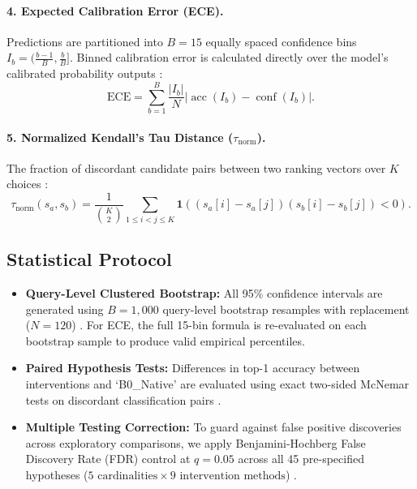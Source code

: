 \documentclass[11pt,a4paper]{article}
\begin{document}
\paragraph{4. Expected Calibration Error (ECE).}
Predictions are partitioned into $B=15$ equally spaced confidence bins $I_b = (\frac{b-1}{B}, \frac{b}{B}]$. Binned calibration error is calculated directly over the model's calibrated probability outputs \citep{guo2017calibration, naeini2015obtaining, nixon2019measuring}:
\begin{equation}
\mathrm{ECE} = \sum_{b=1}^B \frac{|I_b|}{N} \left| \operatorname{acc}(I_b) - \operatorname{conf}(I_b) \right|.
\end{equation}

\paragraph{5. Normalized Kendall's Tau Distance ($\tau_{\mathrm{norm}}$).}
The fraction of discordant candidate pairs between two ranking vectors over $K$ choices \citep{kendall1938new}:
\begin{equation}
\tau_{\mathrm{norm}}(s_a, s_b) = \frac{1}{\binom{K}{2}} \sum_{1 \le i < j \le K} \mathbf{1}\left( (s_a[i] - s_a[j])(s_b[i] - s_b[j]) < 0 \right).
\end{equation}

\subsection{Statistical Protocol}
\begin{itemize}
    \item \textbf{Query-Level Clustered Bootstrap:} All 95\% confidence intervals are generated using $B=1,000$ query-level bootstrap resamples with replacement ($N=120$) \citep{efron1993introduction}. For ECE, the full 15-bin formula is re-evaluated on each bootstrap sample to produce valid empirical percentiles.
    \item \textbf{Paired Hypothesis Tests:} Differences in top-1 accuracy between interventions and `B0\_Native' are evaluated using exact two-sided McNemar tests on discordant classification pairs \citep{mcnemar1947note}.
    \item \textbf{Multiple Testing Correction:} To guard against false positive discoveries across exploratory comparisons, we apply Benjamini-Hochberg False Discovery Rate (FDR) control at $q=0.05$ across all 45 pre-specified hypotheses ($5 \text{ cardinalities} \times 9 \text{ intervention methods}$) \citep{benjamini1995controlling}.
\end{itemize}
\end{document}
